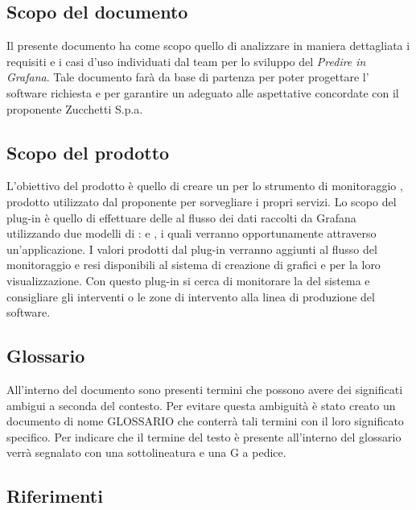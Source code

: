 \documentclass[../analisi-dei-requisiti.tex]{subfiles}
\begin{document}
\subsection{Scopo del documento}%
\label{subs:scopo_del_documento}
Il presente documento ha come scopo quello di analizzare in maniera dettagliata i requisiti e i casi d'uso individuati dal team per lo sviluppo del  \emph{Predire in Grafana}. Tale documento farà da base di partenza per poter progettare l' software richiesta e per garantire un  adeguato alle aspettative concordate con il proponente Zucchetti S.p.a.

\subsection{Scopo del prodotto}%
\label{subs:scopo_del_prodotto}
L'obiettivo del prodotto è quello di creare un  per lo strumento di monitoraggio , prodotto utilizzato dal proponente per sorvegliare i propri servizi. Lo scopo del plug-in è quello di effettuare delle  al flusso dei dati raccolti da Grafana utilizzando due modelli di :  e , i quali verranno opportunamente  attraverso un'applicazione. I valori prodotti dal plug-in verranno aggiunti al flusso del monitoraggio e resi disponibili al sistema di creazione di grafici e  per la loro visualizzazione. Con questo plug-in si cerca di monitorare la  del sistema e consigliare gli interventi o le zone di intervento alla linea di produzione del software.

\subsection{Glossario}
\label{subs:glossario}
All'interno del documento sono presenti termini che possono avere dei significati ambigui a seconda del contesto. Per evitare questa ambiguità è stato creato un documento di nome \textsc{GLOSSARIO} che conterrà tali termini con il loro significato specifico. Per indicare che il termine del testo è presente all'interno del glossario verrà segnalato con una sottolineatura e una G a pedice.

\subsection{Riferimenti}
\label{subs:riferimenti}
\end{document}
